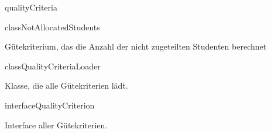 \begin{texdocpackage}{qualityCriteria}
\label{texdoclet:qualityCriteria}

\begin{texdocclass}{class}{NotAllocatedStudents}
\label{texdoclet:qualityCriteria.NotAllocatedStudents}
\begin{texdocclassintro}
Gütekriterium, das die Anzahl der nicht zugeteilten Studenten berechnet\end{texdocclassintro}
\begin{texdocclassconstructors}
\end{texdocclassconstructors}
\begin{texdocclassmethods}
\end{texdocclassmethods}
\end{texdocclass}


\begin{texdocclass}{class}{QualityCriteriaLoader}
\label{texdoclet:qualityCriteria.QualityCriteriaLoader}
\begin{texdocclassintro}
Klasse, die alle Gütekriterien lädt.\end{texdocclassintro}
\begin{texdocclassconstructors}
\end{texdocclassconstructors}
\begin{texdocclassmethods}
\end{texdocclassmethods}
\end{texdocclass}


\begin{texdocclass}{interface}{QualityCriterion}
\label{texdoclet:qualityCriteria.QualityCriterion}
\begin{texdocclassintro}
Interface aller Gütekriterien.\end{texdocclassintro}
\begin{texdocclassmethods}
\end{texdocclassmethods}
\end{texdocclass}



\end{texdocpackage}
